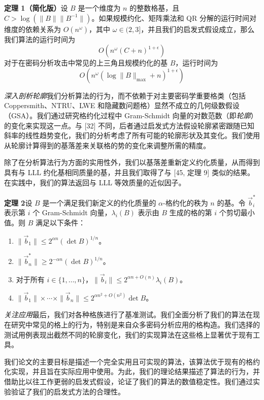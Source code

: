 \documentclass[UTF8]{ctexart}
\begin{document}
        {\bf 定理 1（简化版）}\quad 设 \( B \) 是一个维度为 \( n \) 的整数格基，且 \( C > \log(\|B\|\|B^{-1}\|) \)。如果规模约化、矩阵乘法和 QR 分解的运行时间对维度的依赖关系为 \( O(n^\omega) \)，其中 \( \omega \in (2, 3] \)，并且我们的启发式假设成立，那么我们算法的运行时间为
    \[ O(n^\omega (C + n)^{1 + \epsilon}) \]
    对于在密码分析攻击中常见的上三角且规模约化的基 \( B \)，运行时间为
    \[ O(n^\omega (\log \|B\|_{\max} + n)^{1 + \epsilon}) \]

    \emph{深入剖析轮廓}\quad 我们分析算法的行为，而不依赖于对主要密码学重要格类（包括 Coppersmith、NTRU、LWE 和隐藏数问题格）显然不成立的几何级数假设（GSA）。我们通过研究格约化过程中 Gram-Schmidt 向量的对数范数（即\emph{轮廓}）的变化来实现这一点。与 [32] 不同，后者通过启发式方法假设轮廓紧密跟随已知斜率的线性趋势变化，我们的分析考虑了所有可能的轮廓形状及其变化。我们使用从轮廓计算得到的基落差来关联格的势的变化来调整所需的精度。

    除了在分析算法行为方面的实用性外，我们以基落差重新定义约化质量，从而得到具有与 LLL 约化基相同质量的基，并且我们取得了与 [45, 定理 9] 类似的结果。在实践中，我们的算法返回与 LLL 等效质量的近似因子。

    {\bf 定理 2}\quad 设 \( B \) 是一个满足我们新定义的约化质量的 \( \alpha \)-格约化的秩为 \( n \) 的基。令 \(\vec{b}_i^*\) 表示第 \( i \) 个 Gram-Schmidt 向量，\(\lambda_i(B)\) 表示由 \( B \) 生成的格的第 \( i \) 个剪切最小值。则 \( B \) 满足以下条件：
    \begin{enumerate}
        \item \(\|\vec{b}_1\| \leq 2^{\alpha n} (\det B)^{1/n}\)。
        \item \(\|\vec{b}_n^*\| \geq 2^{-\alpha n} (\det B)^{1/n}\)。
        \item 对于所有 \( i \in \{1, \dots, n\} \)，\(\|\vec{b}_i\| \leq 2^{\alpha n + O(n)} \lambda_i(B)\)。
        \item \(\|\vec{b}_1\| \times \cdots \times \|\vec{b}_n\| \leq 2^{\alpha n^2 + O(n^2)} \det B\)。
    \end{enumerate}

    \emph{关注应用}\quad 最后，我们对各种格族进行了基准测试。我们全面分析了我们的算法在现在研究中常见的格上的行为，特别是来自众多密码分析应用的格构造。我们选择的测试用例表现出截然不同的轮廓变化，我们的实现算法在这些格上显著优于现有工具。

    我们论文的主要目标是描述一个完全实用且可实现的算法，该算法优于现有的格约化实现，并且旨在实际应用中使用。为此，我们的理论结果描述了算法的行为，并借助比以往工作更弱的启发式假设，论证了我们的算法的数值稳定性。我们通过实验验证了我们的启发式方法的合理性。
\end{document}
